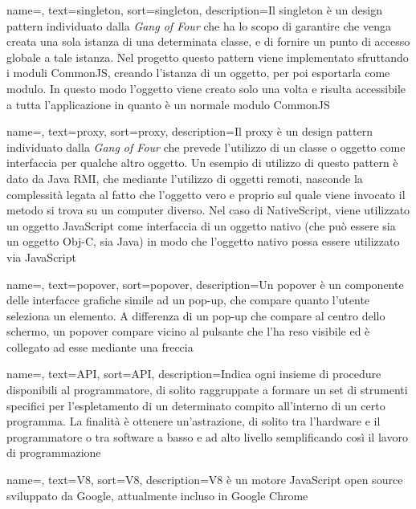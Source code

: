 {
    name=,
    text=singleton,
    sort=singleton,
    description={Il singleton è un design pattern individuato dalla \textit{Gang of Four} che ha lo scopo di garantire che venga creata una sola istanza di una determinata classe, e di fornire un punto di accesso globale a tale istanza.
     Nel progetto questo pattern viene implementato sfruttando i moduli CommonJS, creando l'istanza di un oggetto, per poi esportarla come modulo. In questo modo l'oggetto viene creato solo una volta e risulta accessibile a tutta l'applicazione in quanto è un normale modulo CommonJS}
}

{
    name=,
    text=proxy,
    sort=proxy,
    description={Il proxy è un design pattern individuato dalla \textit{Gang of Four} che prevede l'utilizzo di un classe o oggetto come interfaccia per qualche altro oggetto. Un esempio di utilizzo di questo pattern è dato da Java RMI, che mediante l'utilizzo di oggetti remoti, nasconde la complessità legata al fatto che l'oggetto vero e proprio sul quale viene invocato il metodo si trova su un computer diverso. Nel caso di NativeScript, viene utilizzato un oggetto JavaScript come interfaccia di un oggetto nativo (che può essere sia un oggetto Obj-C, sia Java) in modo che l'oggetto nativo possa essere utilizzato via JavaScript}
}


{
    name=,
    text=popover,
    sort=popover,
    description={Un popover è un componente delle interfacce grafiche simile ad un pop-up, che compare quanto l'utente seleziona un elemento. A differenza di un pop-up che compare al centro dello schermo, un popover compare vicino al pulsante che l'ha reso visibile ed è collegato ad esse mediante una freccia}
}

{
    name=,
    text=API,
    sort=API,
    description={Indica ogni insieme di procedure disponibili al programmatore, di solito raggruppate a formare un set di strumenti specifici per l'espletamento di un determinato compito all'interno di un certo programma. La finalità è ottenere un'astrazione, di solito tra l'hardware e il programmatore o tra software a basso e ad alto livello semplificando così il lavoro di programmazione}
}

{
    name=,
    text=V8,
    sort=V8,
    description={V8 è un motore JavaScript open source sviluppato da Google, attualmente incluso in Google Chrome}
}

